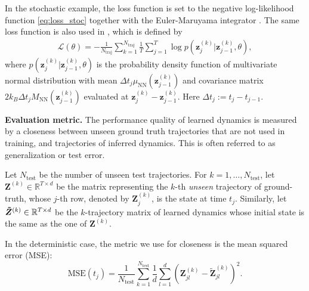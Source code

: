 \documentclass[openacc]{rsproca_new}%
\newcommand{\z}{\bm{z}}
\begin{document}
In the stochastic example, the loss function is set to the negative log-likelihood function \eqref{eq:loss_stoc}
together with the Euler-Maruyama integrator \cite{kloeden1992stochastic}. 
The same loss function is 
also used in \cite{dietrich2021learning, schneider2014maximum},
which is defined by
\begin{equation}\label{eq:loss_stoc}
\begin{split}
    \mathcal{L}(\theta) = -\frac{1}{N_{\text{traj}}} \sum_{k=1}^{N_{\text{traj}}} \frac{1}{T} \sum_{j=1}^{T} 
    \log p(\z_{j}^{(k)}|\z_{j-1}^{(k)},\theta),
\end{split}
\end{equation}
where 
$p(\z_{j}^{(k)}|\z_{j-1}^{(k)},\theta)$
is the probability density function of 
multivariate normal distribution with 
mean $\Delta t_j\mu_{\text{NN}}(\z_{j-1}^{(k)})$ 
and covariance matrix $2k_B\Delta t_j M_{\text{NN}}(\z_{j-1}^{(k)})$
evaluated at $\z_{j}^{(k)}-\z_{j-1}^{(k)}$.
Here $\Delta t_j := t_j - t_{j-1}$.



\textbf{Evaluation metric.}
The performance quality of learned dynamics 
is measured by 
a closeness    
between 
unseen ground truth trajectories 
that are not used in training,
and 
trajectories of inferred dynamics.
This is often referred to  
as generalization or test error.

Let $N_{\text{test}}$ be 
the number of unseen test trajectories.
For $k = 1,\dots,N_{\text{test}}$,
let $\bm{Z}^{(k)} \in\mathbb{R}^{T\times d}$ 
be the matrix representing 
the $k$-th \textit{unseen} trajectory
of ground-truth, 
whose $j$-th row, denoted by $\bm{Z}^{(k)}_j$,
is the state at time $t_j$.
Similarly,
let
$\bm{\Tilde{Z}}^{(k)}
\in\mathbb{R}^{T\times d}$ 
be the $k$-trajectory
matrix of
learned dynamics
whose initial state
is the same as the one of $\bm{Z}^{(k)}$.


In the deterministic case,
the metric we use for closeness is the mean squared error (MSE):
\begin{equation} \label{def:MSE-test}
    \text{MSE}(t_j)
    =\frac{1}{N_{\text{test}}}\sum_{k=1}^{N_{\text{test}}}
    \frac{1}{d}
    \sum_{l=1}^d (\bm{Z}_{jl}^{(k)} - \bm{\tilde{Z}}_{jl}^{(k)})^2.
\end{equation}
\end{document}
